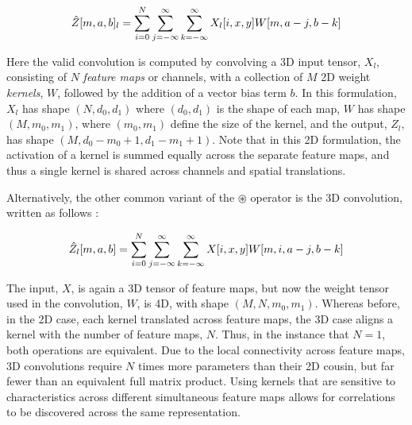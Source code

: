 \begin{equation}
\label{eq:convolution}
\small
\hat{Z}[m, a, b]_l =\sum_{i=0}^{N} \sum_{j=-\infty}^{\infty} \sum_{k=-\infty}^{\infty} X_l[i, x, y]W[m, a - j, b - k]
\end{equation}

\noindent Here the valid convolution is computed by convolving a 3D input tensor, $X_l$, consisting of $N$ \emph{feature maps} or channels, with a collection of $M$ 2D weight \emph{kernels}, $W$, followed by the addition of a vector bias term $b$.
In this formulation, $X_l$ has shape $(N, d_0, d_1)$ where $(d_0,d_1)$ is the shape of each map, $W$ has shape $(M, m_0, m_1)$, where $(m_0,m_1)$ define the size of the kernel, and the output, $Z_l$, has shape $(M, d_0-m_0+1, d_1-m_1+1)$.
Note that in this 2D formulation, the activation of a kernel is summed equally across the separate feature maps, and thus a single kernel is shared across channels and spatial translations.

Alternatively, the other common variant of the $\circledast$ operator is the 3D convolution, written as follows \cite{Ji2013Convolutional}:

\begin{equation}
\label{eq:convolution}
\small
\hat{Z}_l[m, a, b] =\sum_{i=0}^{N} \sum_{j=-\infty}^{\infty} \sum_{k=-\infty}^{\infty} X[i, x, y]W[m, i, a - j, b - k]
\end{equation}

\noindent The input, $X$, is again a 3D tensor of feature maps, but now the weight tensor used in the convolution, $W$, is 4D, with shape $(M, N, m_0, m_1)$.
Whereas before, in the 2D case, each kernel translated across feature maps, the 3D case aligns a kernel with the number of feature maps, $N$.
Thus, in the instance that $N=1$, both operations are equivalent.
Due to the local connectivity across feature maps, 3D convolutions require $N$ times more parameters than their 2D cousin, but far fewer than an equivalent full matrix product.
Using kernels that are sensitive to characteristics across different simultaneous feature maps allows for correlations to be discovered across the same representation.




